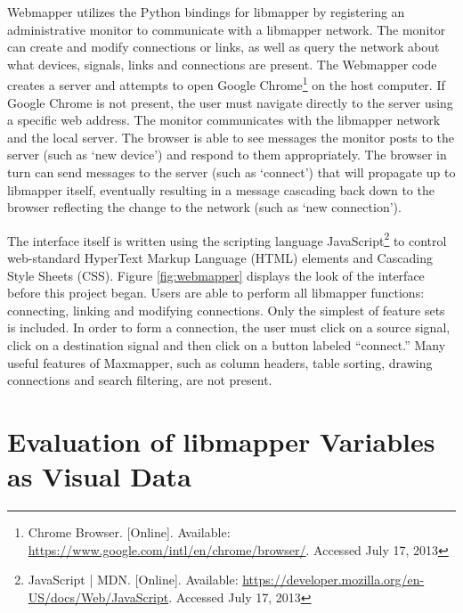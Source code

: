Webmapper utilizes the Python bindings for libmapper by registering an administrative monitor to communicate with a libmapper network. The monitor can create and modify connections or links, as well as query the network about what devices, signals, links and connections are present. The Webmapper code creates a server and attempts to open Google Chrome\footnote{Chrome Browser. [Online]. Available: \url{https://www.google.com/intl/en/chrome/browser/}. Accessed July 17, 2013} on the host computer. If Google Chrome is not present, the user must navigate directly to the server using a specific web address. The monitor communicates with the libmapper network and the local server. The browser is able to see messages the monitor posts to the server (such as `new device') and respond to them appropriately. The browser in turn can send messages to the server (such as `connect') that will propagate up to libmapper itself, eventually resulting in a message cascading back down to the browser reflecting the change to the network (such as `new connection'). 

The interface itself is written using the scripting language JavaScript\footnote{JavaScript | MDN. [Online]. Available: \url{https://developer.mozilla.org/en-US/docs/Web/JavaScript}. Accessed July 17, 2013} to control web-standard HyperText Markup Language (HTML) elements and Cascading Style Sheets (CSS). Figure \ref{fig:webmapper} displays the look of the interface before this project began. Users are able to perform all libmapper functions: connecting, linking and modifying connections. Only the simplest of feature sets is included. In order to form a connection, the user must click on a source signal, click on a destination signal and then click on a button labeled ``connect.'' Many useful features of Maxmapper, such as column headers, table sorting, drawing connections and search filtering, are not present.



\section{Evaluation of libmapper Variables as Visual Data} %
\label{sec:evaluation_of_libmapper_variables}

